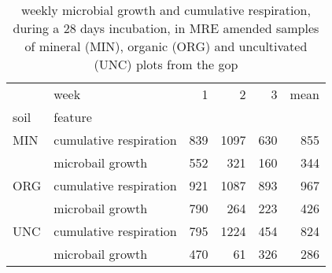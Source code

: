 \begin{table}[H]
\centering
\caption{weekly microbial growth and cumulative respiration, during a 28 days incubation, in MRE amended samples of mineral (MIN), organic (ORG) and uncultivated (UNC) plots from the \gls{gop}}
\label{weekly_microbial_growth_and_cumulative_respiration}
\begin{tabular}{llrrrr}
\toprule
    & week &           1 &            2 &           3 &        mean \\
soil & feature &             &              &             &             \\
\midrule
MIN & cumulative respiration &  839 &  1097 &  630 &  855\\
    & microbail growth &  552 &   321&  160 &  344 \\
ORG & cumulative respiration &  921 &  1087 &  893 &  967 \\
    & microbail growth &  790 &   264 &  223 &  426 \\
UNC & cumulative respiration &  795 &  1224 &  454 &  824 \\
    & microbail growth &  470 &    61 &  326 &  286 \\
\bottomrule
\end{tabular}
\end{table}
